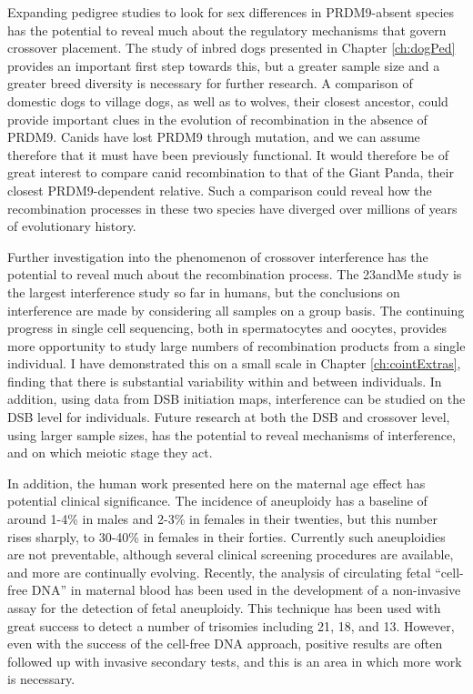 Expanding pedigree studies to look for sex differences in PRDM9-absent species has the potential to reveal much about the regulatory mechanisms that govern crossover placement.
The study of inbred dogs presented in Chapter \ref{ch:dogPed} provides an important first step towards this, but a greater sample size and a greater breed diversity is necessary for further research.
A comparison of domestic dogs to village dogs, as well as to wolves, their closest ancestor, could provide important clues in the evolution of recombination in the absence of PRDM9.
Canids have lost PRDM9 through mutation, and we can assume therefore that it must have been previously functional.
It would therefore be of great interest to compare canid recombination to that of the Giant Panda, their closest PRDM9-dependent relative.
Such a comparison could reveal how the recombination processes in these two species have diverged over millions of years of evolutionary history.

Further investigation into the phenomenon of crossover interference has the potential to reveal much about the recombination process.
The 23andMe study is the largest interference study so far in humans, but the conclusions on interference are made by considering all samples on a group basis.
The continuing progress in single cell sequencing, both in spermatocytes and oocytes, provides more opportunity to study large numbers of recombination products from a single individual.
I have demonstrated this on a small scale in Chapter \ref{ch:cointExtras}, finding that there is substantial variability within and between individuals.
In addition, using data from DSB initiation maps\cite{Pratto2014}, interference can be studied on the DSB level for individuals.
Future research at both the DSB and crossover level, using larger sample sizes, has the potential to reveal mechanisms of interference, and on which meiotic stage they act.

In addition, the human work presented here on the maternal age effect has potential clinical significance.
The incidence of aneuploidy has a baseline of around 1-4\% in males and 2-3\% in females in their twenties, but this number rises sharply, to 30-40\% in females in their forties\cite{Hassold2009,Nagaoka2012}.
Currently such aneuploidies are not preventable, although several clinical screening procedures are available, and more are continually evolving.
Recently, the analysis of circulating fetal ``cell-free DNA'' in maternal blood has been used in the development of a non-invasive assay for the detection of fetal aneuploidy\cite{Lo2007}.
This technique has been used with great success to detect a number of trisomies including 21\cite{Papageorgiou2011}, 18\cite{Palomaki2012}, and 13\cite{Palomaki2012}.
However, even with the success of the cell-free DNA approach, positive results are often followed up with invasive secondary tests, and this is an area in which more work is necessary.

